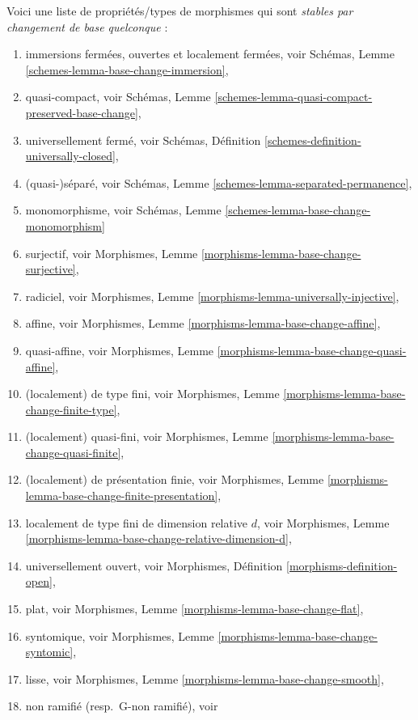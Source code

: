 \begin{remark}
\label{remark-list-properties-stable-base-change}
Voici une liste de propriétés/types de morphismes
qui sont {\it stables par changement de base quelconque} :
\begin{enumerate}
\item immersions fermées, ouvertes et localement fermées, voir
Schémas, Lemme \ref{schemes-lemma-base-change-immersion},
\item quasi-compact, voir
Schémas, Lemme \ref{schemes-lemma-quasi-compact-preserved-base-change},
\item universellement fermé, voir
Schémas, Définition \ref{schemes-definition-universally-closed},
\item (quasi-)séparé, voir
Schémas, Lemme \ref{schemes-lemma-separated-permanence},
\item monomorphisme, voir
Schémas, Lemme \ref{schemes-lemma-base-change-monomorphism}
\item surjectif, voir
Morphismes, Lemme \ref{morphisms-lemma-base-change-surjective},
\item radiciel, voir
Morphismes, Lemme \ref{morphisms-lemma-universally-injective},
\item affine, voir
Morphismes, Lemme \ref{morphisms-lemma-base-change-affine},
\item quasi-affine, voir
Morphismes, Lemme \ref{morphisms-lemma-base-change-quasi-affine},
\item (localement) de type fini, voir
Morphismes, Lemme \ref{morphisms-lemma-base-change-finite-type},
\item (localement) quasi-fini, voir
Morphismes, Lemme \ref{morphisms-lemma-base-change-quasi-finite},
\item (localement) de présentation finie, voir
Morphismes, Lemme \ref{morphisms-lemma-base-change-finite-presentation},
\item localement de type fini de dimension relative $d$, voir
Morphismes, Lemme \ref{morphisms-lemma-base-change-relative-dimension-d},
\item universellement ouvert, voir
Morphismes, Définition \ref{morphisms-definition-open},
\item plat, voir
Morphismes, Lemme \ref{morphisms-lemma-base-change-flat},
\item syntomique, voir
Morphismes, Lemme \ref{morphisms-lemma-base-change-syntomic},
\item lisse, voir
Morphismes, Lemme \ref{morphisms-lemma-base-change-smooth},
\item non ramifié (resp.\ G-non ramifié), voir

\end{enumerate}
\end{remark}

